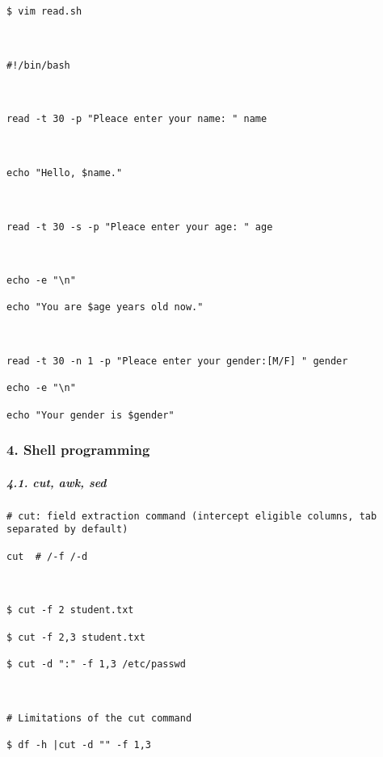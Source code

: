 \documentclass[
]{article}
\begin{document}
\begin{verbatim}
$ vim read.sh



#!/bin/bash



read -t 30 -p "Pleace enter your name: " name



echo "Hello, $name."



read -t 30 -s -p "Pleace enter your age: " age



echo -e "\n"

echo "You are $age years old now."



read -t 30 -n 1 -p "Pleace enter your gender:[M/F] " gender

echo -e "\n"

echo "Your gender is $gender"
\end{verbatim}

\hypertarget{header-n203}{%
\subsubsection{4. Shell programming}\label{header-n203}}

\hypertarget{header-n346}{%
\subparagraph{4.1. cut, awk, sed}\label{header-n346}}

\begin{verbatim}
# cut: field extraction command (intercept eligible columns, tab separated by default)

cut  # /-f /-d



$ cut -f 2 student.txt 

$ cut -f 2,3 student.txt 

$ cut -d ":" -f 1,3 /etc/passwd



# Limitations of the cut command

$ df -h |cut -d "" -f 1,3
\end{verbatim}
\end{document}
